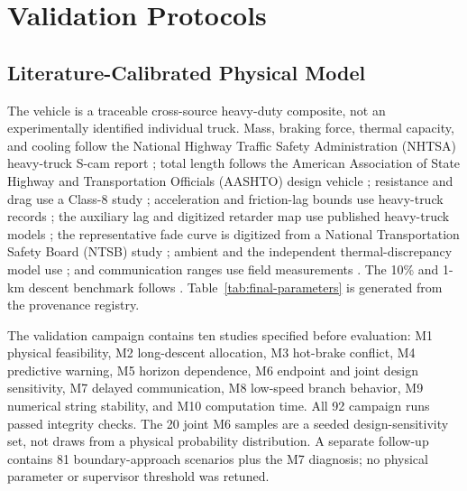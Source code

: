 \section{Validation Protocols}
\subsection{Literature-Calibrated Physical Model}
The vehicle is a traceable cross-source heavy-duty composite, not an experimentally identified individual truck. Mass, braking force, thermal capacity, and cooling follow the National Highway Traffic Safety Administration (NHTSA) heavy-truck S-cam report \cite{nhtsa2010scam}; total length follows the American Association of State Highway and Transportation Officials (AASHTO) design vehicle \cite{aashto2004}; resistance and drag use a Class-8 study \cite{wang2015fuel}; acceleration and friction-lag bounds use heavy-truck records \cite{vegamoor2018,yanakiev1998}; the auxiliary lag and digitized retarder map use published heavy-truck models \cite{li2026retarder,donkers2020powertrain}; the representative fade curve is digitized from a National Transportation Safety Board (NTSB) study \cite{ntsb2002simulation}; ambient and the independent thermal-discrepancy model use \cite{yan2018thermal}; and communication ranges use field measurements \cite{hu2021delay,gao2016dsrc}. The 10\% and 1-km descent benchmark follows \cite{devika2022fade}. Table~\ref{tab:final-parameters} is generated from the provenance registry.



The validation campaign contains ten studies specified before evaluation: M1 physical feasibility, M2 long-descent allocation, M3 hot-brake conflict, M4 predictive warning, M5 horizon dependence, M6 endpoint and joint design sensitivity, M7 delayed communication, M8 low-speed branch behavior, M9 numerical string stability, and M10 computation time. All 92 campaign runs passed integrity checks. The 20 joint M6 samples are a seeded design-sensitivity set, not draws from a physical probability distribution. A separate follow-up contains 81 boundary-approach scenarios plus the M7 diagnosis; no physical parameter or supervisor threshold was retuned.

